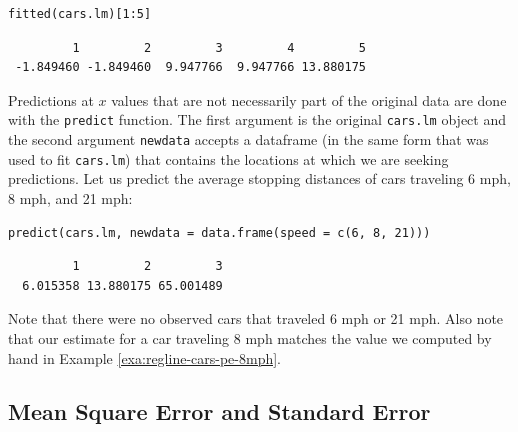 \documentclass[captions=tableheading]{scrbook}
\begin{document}
\begin{verbatim}
fitted(cars.lm)[1:5]
\end{verbatim}

\begin{verbatim}
         1         2         3         4         5 
 -1.849460 -1.849460  9.947766  9.947766 13.880175
\end{verbatim}

Predictions at \(x\) values that are not necessarily part of the original data are done with the \texttt{predict} function. The first argument is the original \texttt{cars.lm} object and the second argument \texttt{newdata} accepts a dataframe (in the same form that was used to fit \texttt{cars.lm}) that contains the locations at which we are seeking predictions. Let us predict the average stopping distances of cars traveling 6 mph, 8 mph, and 21 mph:


\begin{verbatim}
predict(cars.lm, newdata = data.frame(speed = c(6, 8, 21)))
\end{verbatim}

\begin{verbatim}
         1         2         3 
  6.015358 13.880175 65.001489
\end{verbatim}

Note that there were no observed cars that traveled 6 mph or 21 mph. Also note that our estimate for a car traveling 8 mph matches the value we computed by hand in Example \ref{exa:regline-cars-pe-8mph}.
\subsection{Mean Square Error and Standard Error}
\label{sec-1-2-3}
\end{document}
